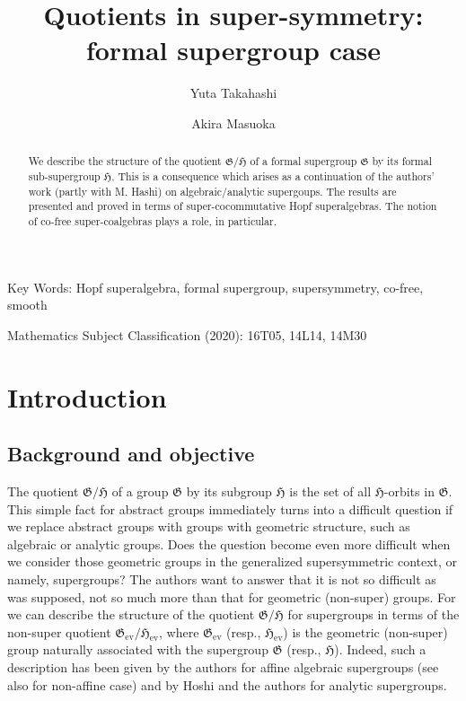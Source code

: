\documentclass[11pt, a4paper]{amsart}
\title[Quotients in super-symmetry]
{Quotients in super-symmetry: \\ formal supergroup case}
\author[Y.~Takahashi]{Yuta Takahashi}
\author[A.~Masuoka]{Akira Masuoka}
\theoremstyle{definition}
\numberwithin{equation}{section}
\begin{document}
\begin{abstract}
We describe the structure of the quotient $\mathfrak{G}/\mathfrak{H}$ of a formal supergroup $\mathfrak{G}$ by its formal sub-supergroup $\mathfrak{H}$. 
This is a consequence which arises as a continuation of the authors' work 
(partly with M. Hashi) on algebraic/analytic supergoups.
The results are presented and proved in terms 
of super-cocommutative Hopf superalgebras. The notion of 
co-free super-coalgebras plays a role, in particular. 
\end{abstract}


\maketitle

\noindent
{\sc Key Words:}
Hopf superalgebra, formal supergroup, supersymmetry, co-free, smooth

\medskip
\noindent
{\sc Mathematics Subject Classification (2020):}
16T05, %
14L14, %
14M30 %

\section{Introduction}\label{Sec1}

\subsection{Background and objective}
The quotient $\mathfrak{G}/\mathfrak{H}$ of a group $\mathfrak{G}$ by its subgroup $\mathfrak{H}$ 
is the set of all $\mathfrak{H}$-orbits in $\mathfrak{G}$. This simple fact for abstract groups immediately turns
into a difficult question if we replace abstract groups with groups with geometric structure, such as algebraic
or analytic groups. Does the question become even more difficult when we consider those geometric groups 
in the generalized supersymmetric context, or namely, supergroups? 
The authors want to answer that it is not so difficult as was supposed, not so much more than that
for geometric (non-super) groups. For we can describe the structure
of the quotient $\mathfrak{G}/\mathfrak{H}$ for supergroups in terms of the non-super quotient 
$\mathfrak{G}_{\operatorname{ev}}/\mathfrak{H}_{\operatorname{ev}}$, where 
$\mathfrak{G}_{\operatorname{ev}}$ (resp., $\mathfrak{H}_{\operatorname{ev}}$) is the geometric (non-super)
group naturally associated with the supergroup $\mathfrak{G}$ (resp., $\mathfrak{H}$). 
Indeed, such a description has been given by the authors \cite[Theorem 4.12, Remark 4.13]{MT} for affine algebraic supergroups (see also \cite[Sect.]{MZ1} for non-affine case)
and by Hoshi and the authors \cite[Theorem 7.3, Remark 7.4 (1)]{HMT} for analytic supergroups. 
\end{document}
